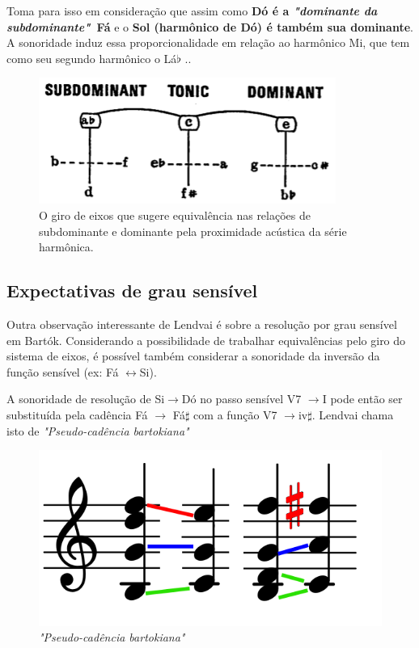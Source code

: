 \documentclass[
	12pt,				%
	openright,			%
	twoside,			%
	a4paper,			%
	english,			%
	french,				%
	spanish,			%
	brazil				%
	]{abntex2}
\begin{document}
Toma para isso em consideração que assim como \textbf{Dó é a \textit{"dominante da subdominante"}\ Fá} e o \textbf{Sol (harmônico de Dó) é também sua dominante}. A sonoridade induz essa proporcionalidade em relação ao harmônico Mi, que tem como seu segundo harmônico o Lá$\flat$ .\cite[p. 11]{lendvai1971bela}.

\begin{figure}[!h]
	\caption{\label{fig_grafico}O giro de eixos que sugere equivalência nas relações de subdominante e dominante pela proximidade acústica da série harmônica. }
	\begin{center}
	    \includegraphics[scale=0.5]{axis/giro_de_eixos.png}
	\end{center}
\end{figure}


\pagebreak
\subsection{Expectativas de grau sensível}

Outra observação interessante de Lendvai é sobre a resolução por grau sensível em Bartók. Considerando a possibilidade de trabalhar equivalências pelo giro do sistema de eixos, é possível também considerar a sonoridade da inversão da função sensível (ex: Fá $\leftrightarrow$Si).

A sonoridade de resolução de Si$\rightarrow$Dó no passo sensível V7 $\rightarrow$I pode então ser substituída pela cadência Fá  $\rightarrow$ Fá$\sharp$ com a função  V7 $\rightarrow$iv$\sharp$. Lendvai chama isto de \textit{"Pseudo-cadência bartokiana"}\cite[p. 13]{lendvai1971bela}

\begin{figure}[!h]
	\caption{\label{fig_grafico}\textit{"Pseudo-cadência bartokiana"} }
	\begin{center}
	    \includegraphics[scale=0.4]{axis/resolve.png}
	\end{center}
\end{figure}
\end{document}
